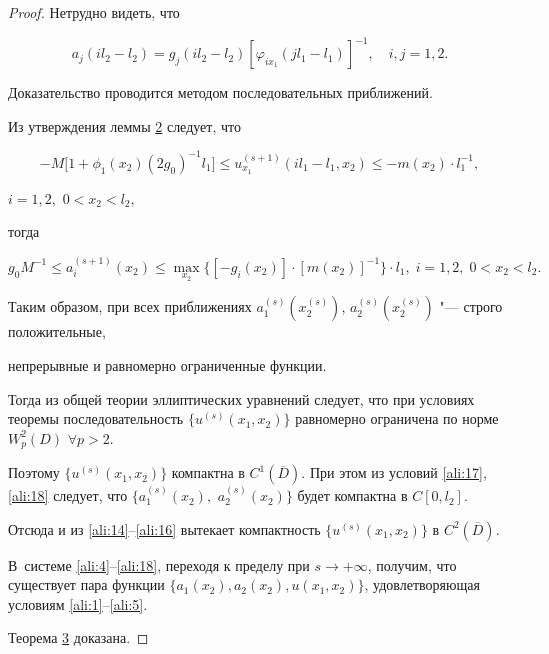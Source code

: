 \begin{proof} Нетрудно видеть, что

$$

a_j(il_2-l_2)=g_j(il_2-l_2)[\varphi_{ix_1}(jl_1-l_1)]^{-1}, \quad i,j = 1, 2.

$$



Доказательство проводится методом последовательных приближений. 

Из утверждения леммы \hyperlink{ali:lemma2}{2} следует, что 

$$

-M\bigl[1+\phi_1(x_2)(2g_0)^{-1}l_1\bigr]\le u_{x_1}^{(s+1)}(il_1-l_1,x_2)\le-m(x_2)\cdot l_1^{-1},

$$

$i = 1, 2,$  $0<x_2<l_2,$

тогда 

$$

g_0M^{-1}\le a_i^{(s+1)}(x_2)\le\max\limits_{x_2}\bigl\{[-g_i(x_2)]\cdot[m(x_2)]^{-1}\bigr\}\cdot l_1, \; i=1, 2, \; 0<x_2<l_2.

$$



Таким образом, при всех приближениях $a_1^{(s)}(x_2^{(s)})$, $a_2^{(s)}(x_2^{(s)})$ "--- строго положительные, 

непрерывные и равномерно ограниченные функции. 

Тогда из общей теории эллиптических уравнений следует, что при условиях теоремы последовательность $\{u^{(s)}(x_1,x_2)\}$ равномерно ограничена по норме $W_p^2(D)$ $\forall p>2$. 

Поэтому $\{u^{(s)}(x_1,x_2)\}$ компактна в $C^1(\overline D)$. При этом из условий \eqref{ali:17}, \eqref{ali:18} следует, что $\{a_1^{(s)}(x_2),$ $a_2^{(s)}(x_2)\}$ будет компактна в $C[0,l_2]$. 

Отсюда и из \eqref{ali:14}--\eqref{ali:16} вытекает компактность $\{u^{(s)}(x_1,x_2)\}$ в $C^2(\overline D)$. 

В~системе \eqref{ali:4}--\eqref{ali:18}, переходя к пределу при $s\to+\infty$, получим, что существует пара функции $\{a_1(x_2),a_2(x_2),u(x_1,x_2)\}$, удовлетворяющая условиям \eqref{ali:1}--\eqref{ali:5}.

 Теорема \hyperlink{ali:thm3}{3} доказана. \end{proof}

 

 \smallskip





